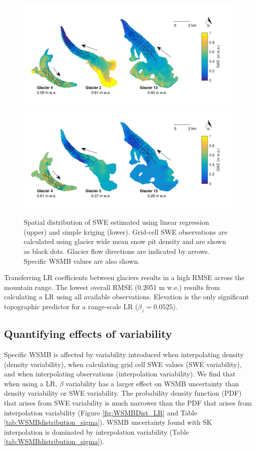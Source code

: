 \documentclass[twocolumn,letterpaper]{igs}
\begin{document}
\begin{figure}
	\centering
	\includegraphics[width =\textwidth]{LR_map.pdf}\\
    \includegraphics[width =\textwidth]{SK_map.pdf}\\
	\caption{Spatial distribution of SWE estimated using linear regression (upper) and simple kriging (lower). Grid-cell SWE observations are calculated using glacier wide mean snow pit density and are shown as black dots. Glacier flow directions are indicated by arrows. Specific WSMB values are also shown.}
	\label{fig:LR_SK_map}
\end{figure}

Transferring LR coefficients between glaciers results in a high RMSE across the mountain range. The lowest overall RMSE (0.2051 m w.e.) results from calculating a LR using all available observations. Elevation is the only significant topographic predictor for a range-scale LR ($\beta_z=0.0525$).


\subsection{Quantifying effects of variability}

Specific WSMB is affected by variability introduced when interpolating density (density variability), when calculating grid cell SWE values (SWE variability), and when interpolating observations (interpolation variability). We find that when using a LR, $\beta$ variability has a larger effect on WSMB uncertainty than density variability or SWE variability. The probability density function (PDF) that arises from SWE variability is much narrower than the PDF that arises from interpolation variability (Figure \ref{fig:WSMBDist_LR} and Table \ref{tab:WSMBdistribution_sigma}). WSMB uncertainty found with SK interpolation is dominated by interpolation variability (Table \ref{tab:WSMBdistribution_sigma}).  
\end{document}
